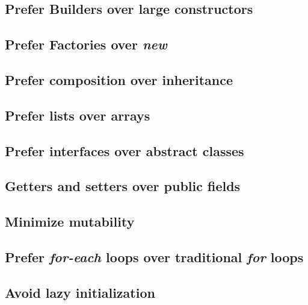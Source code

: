 \subsection{Prefer Builders over large constructors}

\subsection{Prefer Factories over \emph{new}}

\subsection{Prefer composition over inheritance}

\subsection{Prefer lists over arrays}

\subsection{Prefer interfaces over abstract classes}

\subsection{Getters and setters over public fields}

\subsection{Minimize mutability}

\subsection{Prefer \emph{for-each} loops over traditional \emph{for} loops}

\subsection{Avoid lazy initialization}

